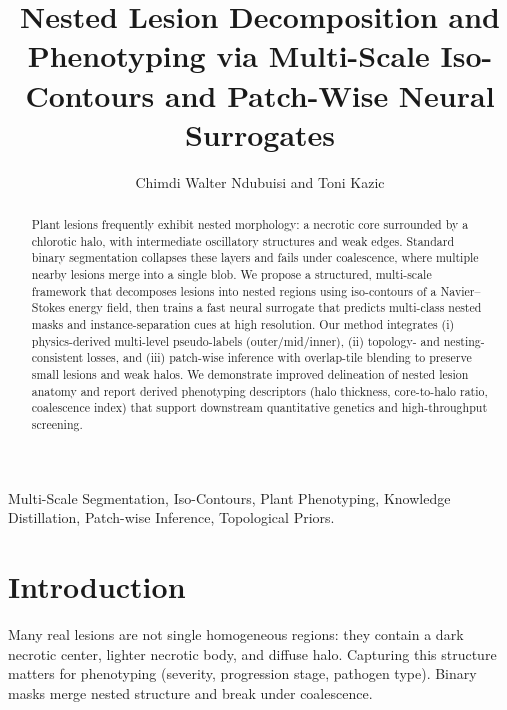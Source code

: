 \documentclass[journal]{IEEEtran}
\begin{document}
\title{Nested Lesion Decomposition and Phenotyping via Multi-Scale Iso-Contours and Patch-Wise Neural Surrogates}

\author{Chimdi Walter Ndubuisi and Toni Kazic}

\maketitle

\begin{abstract}
Plant lesions frequently exhibit nested morphology: a necrotic core surrounded by a chlorotic halo, with intermediate oscillatory structures and weak edges. Standard binary segmentation collapses these layers and fails under coalescence, where multiple nearby lesions merge into a single blob. We propose a structured, multi-scale framework that decomposes lesions into nested regions using iso-contours of a Navier--Stokes energy field, then trains a fast neural surrogate that predicts multi-class nested masks and instance-separation cues at high resolution. Our method integrates (i) physics-derived multi-level pseudo-labels (outer/mid/inner), (ii) topology- and nesting-consistent losses, and (iii) patch-wise inference with overlap-tile blending to preserve small lesions and weak halos. We demonstrate improved delineation of nested lesion anatomy and report derived phenotyping descriptors (halo thickness, core-to-halo ratio, coalescence index) that support downstream quantitative genetics and high-throughput screening.
\end{abstract}

\begin{IEEEkeywords}
Multi-Scale Segmentation, Iso-Contours, Plant Phenotyping, Knowledge Distillation, Patch-wise Inference, Topological Priors.
\end{IEEEkeywords}

\section{Introduction}
Many real lesions are not single homogeneous regions: they contain a dark necrotic center, lighter necrotic body, and diffuse halo.
Capturing this structure matters for phenotyping (severity, progression stage, pathogen type).
Binary masks merge nested structure and break under coalescence.
\end{document}
